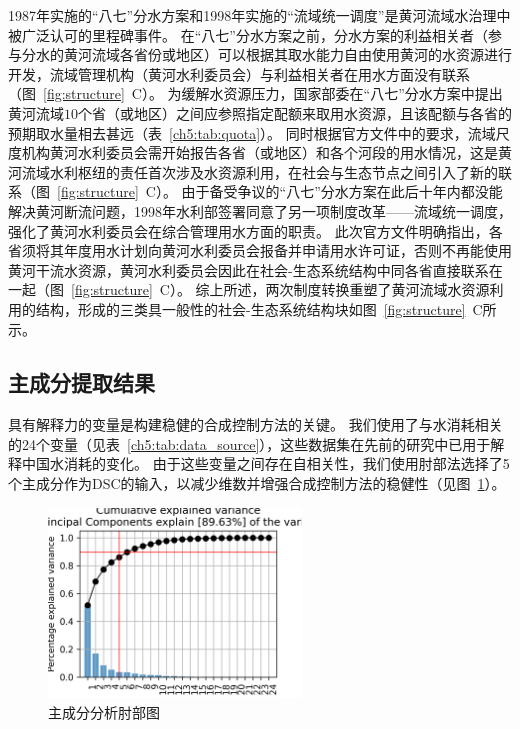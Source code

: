 1987年实施的“八七”分水方案和1998年实施的“流域统一调度”是黄河流域水治理中被广泛认可的里程碑事件。
在“八七”分水方案之前，分水方案的利益相关者（参与分水的黄河流域各省份或地区）可以根据其取水能力自由使用黄河的水资源进行开发，流域管理机构（黄河水利委员会）与利益相关者在用水方面没有联系（图~\ref{fig:structure}~C）。
为缓解水资源压力，国家部委在“八七”分水方案中提出黄河流域$10$个省（或地区）之间应参照指定配额来取用水资源，且该配额与各省的预期取水量相去甚远（表~\ref{ch5:tab:quota}）。
同时根据官方文件中的要求，流域尺度机构黄河水利委员会需开始报告各省（或地区）和各个河段的用水情况，这是黄河流域水利枢纽的责任首次涉及水资源利用，在社会与生态节点之间引入了新的联系（图~\ref{fig:structure}~C）。
由于备受争议的“八七”分水方案在此后十年内都没能解决黄河断流问题，1998年水利部签署同意了另一项制度改革——流域统一调度，强化了黄河水利委员会在综合管理用水方面的职责。
此次官方文件明确指出，各省须将其年度用水计划向黄河水利委员会报备并申请用水许可证，否则不再能使用黄河干流水资源，黄河水利委员会因此在社会-生态系统结构中同各省直接联系在一起（图~\ref{fig:structure}~C）。
综上所述，两次制度转换重塑了黄河流域水资源利用的结构，形成的三类具一般性的社会-生态系统结构块如图~\ref{fig:structure}~C所示。



\subsection{主成分提取结果}

具有解释力的变量是构建稳健的合成控制方法的关键。
我们使用了与水消耗相关的24个变量（见表~\ref{ch5:tab:data_source}），这些数据集在先前的研究中已用于解释中国水消耗的变化\cite{zhou2020}。
由于这些变量之间存在自相关性，我们使用肘部法选择了5个主成分作为DSC的输入，以减少维数并增强合成控制方法的稳健性（见图~\ref{ch5:fig:elbow}）。

\begin{figure}[htb]
    \centering
    \includegraphics[width=0.6\textwidth]{img/ch5/ch5_elbow.png}
    \caption{主成分分析肘部图}\label{ch5:fig:elbow}
\end{figure}

